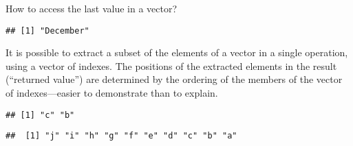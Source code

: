 \documentclass[krantz2]{krantz}\usepackage{knitr}
\begin{document}
\begin{faqbox}{How to access the last value in a vector?}
\begin{knitrout}\footnotesize
{}\color{fgcolor}\begin{kframe}
\begin{alltt}
\hlstd{month.name[}\hlstd{(month.name)]}
\end{alltt}
\begin{verbatim}
## [1] "December"
\end{verbatim}
\end{kframe}
\end{knitrout}

\end{faqbox}
It is possible to extract a subset of the elements of a vector in a single operation, using a vector of indexes. The positions of the extracted elements in the result (``returned value'') are determined by the ordering of the members of the vector of indexes---easier to demonstrate than to explain.

\begin{knitrout}\footnotesize
{}\color{fgcolor}\begin{kframe}
\begin{alltt}
\hlstd{a[}\hlstd{(}\hlstd{,} \hlstd{)]}
\end{alltt}
\begin{verbatim}
## [1] "c" "b"
\end{verbatim}
\begin{alltt}
\hlstd{a[}\hlopt{:}\hlstd{]}
\end{alltt}
\begin{verbatim}
##  [1] "j" "i" "h" "g" "f" "e" "d" "c" "b" "a"
\end{verbatim}
\end{kframe}
\end{knitrout}
\end{document}
